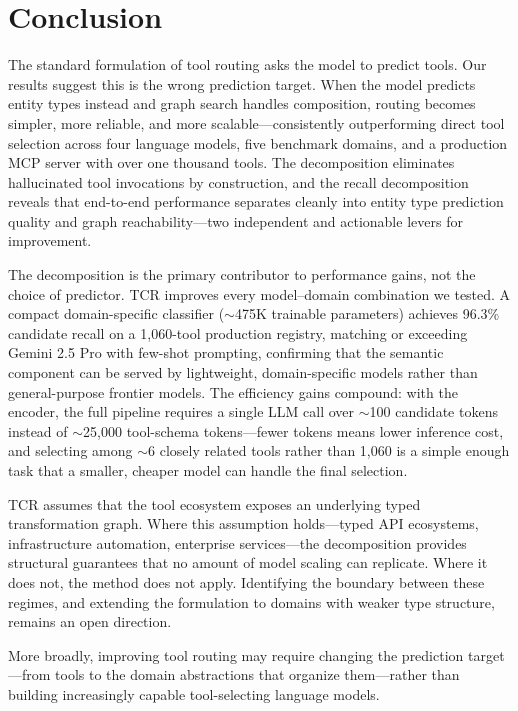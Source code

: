 
\section{Conclusion}
\label{sec:conclusion}

The standard formulation of tool routing asks the model to predict tools.
Our results suggest this is the wrong prediction target.
When the model predicts entity types instead and graph search handles composition, routing becomes simpler, more reliable, and more scalable---consistently outperforming direct tool selection across four language models, five benchmark domains, and a production MCP server with over one thousand tools.
The decomposition eliminates hallucinated tool invocations by construction, and the recall decomposition reveals that end-to-end performance separates cleanly into entity type prediction quality and graph reachability---two independent and actionable levers for improvement.

The decomposition is the primary contributor to performance gains, not the choice of predictor.
TCR improves every model--domain combination we tested.
A compact domain-specific classifier ($\sim$475K trainable parameters) achieves 96.3\% candidate recall on a 1,060-tool production registry, matching or exceeding Gemini 2.5 Pro with few-shot prompting, confirming that the semantic component can be served by lightweight, domain-specific models rather than general-purpose frontier models.
The efficiency gains compound: with the encoder, the full pipeline requires a single LLM call over ${\sim}$100 candidate tokens instead of ${\sim}$25,000 tool-schema tokens---fewer tokens means lower inference cost, and selecting among ${\sim}$6 closely related tools rather than 1,060 is a simple enough task that a smaller, cheaper model can handle the final selection.

TCR assumes that the tool ecosystem exposes an underlying typed transformation graph.
Where this assumption holds---typed API ecosystems, infrastructure automation, enterprise services---the decomposition provides structural guarantees that no amount of model scaling can replicate.
Where it does not, the method does not apply.
Identifying the boundary between these regimes, and extending the formulation to domains with weaker type structure, remains an open direction.

More broadly, improving tool routing may require changing the prediction target---from tools to the domain abstractions that organize them---rather than building increasingly capable tool-selecting language models.
